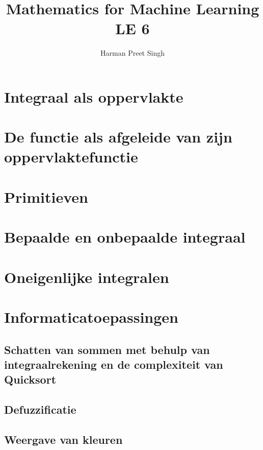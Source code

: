\documentclass[a4paper, 12pt]{article}
\title{Mathematics for Machine Learning \textemdash{} LE 6}
\author{Harman Preet Singh}
\begin{document}

\maketitle
\tableofcontents

\section{Integraal als oppervlakte}
\section{De functie als afgeleide van zijn oppervlaktefunctie}
\section{Primitieven}
\section{Bepaalde en onbepaalde integraal}
\section{Oneigenlijke integralen}

\section{Informaticatoepassingen}
\subsection{Schatten van sommen met behulp van integraalrekening en de complexiteit van Quicksort}
\subsection{Defuzzificatie}
\subsection{Weergave van kleuren}
\end{document}
